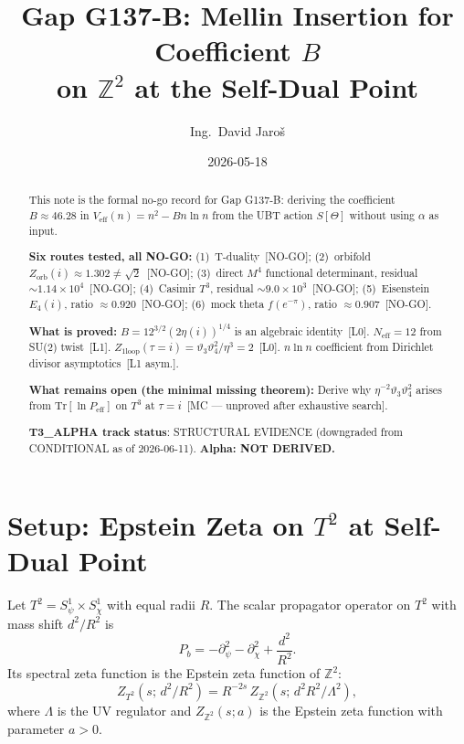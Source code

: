 \documentclass[12pt,a4paper]{article}
\title{Gap G137-B: Mellin Insertion for Coefficient $B$\\
       on $\mathbb{Z}^2$ at the Self-Dual Point}
\author{Ing.\ David Jaroš}
\date{2026-05-18}
\begin{document}
\maketitle

\begin{abstract}
This note is the formal no-go record for Gap G137-B: deriving the coefficient
$B \approx 46.28$ in $V_{\mathrm{eff}}(n) = n^2 - Bn\ln n$ from the UBT action
$S[\Theta]$ without using $\alpha$ as input.

\textbf{Six routes tested, all NO-GO:}
(1)~T-duality~[NO-GO];
(2)~orbifold $Z_{\mathrm{orb}}(i) \approx 1.302 \neq \sqrt{2}$~[NO-GO];
(3)~direct $M^4$ functional determinant, residual $\sim 1.14\times10^4$~[NO-GO];
(4)~Casimir $T^3$, residual $\sim 9.0\times10^3$~[NO-GO];
(5)~Eisenstein $E_4(i)$, ratio $\approx 0.920$~[NO-GO];
(6)~mock theta $f(e^{-\pi})$, ratio $\approx 0.907$~[NO-GO].

\textbf{What is proved:}
$B = 12^{3/2}(2\eta(i))^{1/4}$ is an algebraic identity~[L0].
$N_{\mathrm{eff}} = 12$ from SU(2) twist~[L1].
$Z_{1\mathrm{loop}}(\tau=i) = \vartheta_3\vartheta_4^2/\eta^3 = 2$~[L0].
$n\ln n$ coefficient from Dirichlet divisor asymptotics~[L1 asym.].

\textbf{What remains open (the minimal missing theorem):}
Derive why $\eta^{-2}\vartheta_3\vartheta_4^2$ arises from
$\mathrm{Tr}[\ln P_{\mathrm{eff}}]$ on $T^3$ at $\tau=i$~[MC --- unproved after
exhaustive search].

\textbf{T3\_ALPHA track status}: STRUCTURAL EVIDENCE (downgraded from
CONDITIONAL as of 2026-06-11). \textbf{Alpha: NOT DERIVED.}
\end{abstract}

\tableofcontents

\section{Setup: Epstein Zeta on $T^2$ at Self-Dual Point}
\label{sec:setup}

Let $T^2 = S^1_\psi \times S^1_\chi$ with equal radii $R$.
The scalar propagator operator on $T^2$ with mass shift $d^2/R^2$ is
\[
P_b = -\partial^2_\psi - \partial^2_\chi + \frac{d^2}{R^2}.
\]
Its spectral zeta function is the Epstein zeta function of $\mathbb{Z}^2$:
\[
Z_{T^2}(s;\, d^2/R^2)
= R^{-2s}\, Z_{\mathbb{Z}^2}(s;\, d^2 R^2 / \Lambda^2),
\]
where $\Lambda$ is the UV regulator and $Z_{\mathbb{Z}^2}(s; a)$
is the Epstein zeta function with parameter $a > 0$.
\end{document}
